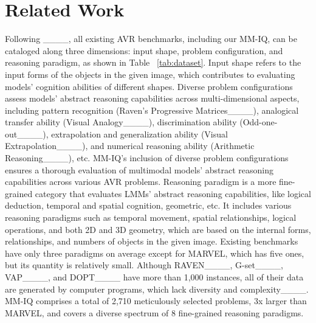 \section{Related Work}
\label{sec:Categories}
Following ____, all existing AVR benchmarks, including our MM-IQ, can be cataloged along three dimensions: input shape, problem configuration, and reasoning paradigm, as shown in Table ~\ref{tab:dataset}.
Input shape refers to the input forms of the objects in the given image, which contributes to evaluating models' cognition abilities of different shapes. Diverse problem configurations assess models' abstract reasoning capabilities across multi-dimensional aspects, including pattern recognition (Raven’s Progressive Matrices____), analogical transfer ability (Visual Analogy____), discrimination ability (Odd-one-out____), extrapolation and generalization ability (Visual Extrapolation____), and numerical reasoning ability (Arithmetic Reasoning____), etc. MM-IQ's inclusion of diverse problem configurations ensures a thorough evaluation of multimodal models' abstract reasoning capabilities across various AVR problems. Reasoning paradigm is a more fine-grained category that evaluates LMMs' abstract reasoning capabilities, like logical deduction, temporal and spatial cognition, geometric, etc. It includes various reasoning paradigms such as temporal movement, spatial relationships, logical operations, and both 2D and 3D geometry, which are based on the internal forms, relationships, and numbers of objects in the given image. Existing benchmarks have only three paradigms on average except for MARVEL, which has five ones, but its quantity is relatively small. Although RAVEN____,  G-set____, VAP____, and DOPT____ have more than 1,000 instances, all of their data are generated by computer programs, which lack diversity and complexity____. MM-IQ comprises a total of 2,710 meticulously selected problems, 3x larger than MARVEL, and covers a diverse spectrum of 8 fine-grained reasoning paradigms.

